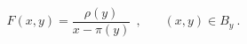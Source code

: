 \begin{equation}
F(x,y)  =
\frac{\rho (y)}{x - \pi (y)}\ \ , \ \ \ \ \ \ \ \ (x,y) \in B_y\ .
\label{2.4}
\end{equation}

